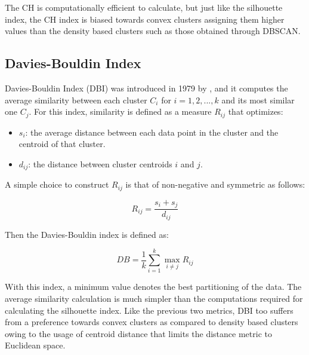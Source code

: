 

The CH is computationally efficient to calculate, but just like the silhouette index, the CH index is biased towards convex clusters assigning them higher values than the density based clusters such as those obtained through DBSCAN.

\subsection{Davies-Bouldin Index}

Davies-Bouldin Index (DBI) was introduced in 1979 by \cite{4766909}, and it computes the average similarity between each cluster $C_i$ for $i = 1,2,...,k$ and its most similar one $C_j$.  For this index, similarity is defined as a measure $R_{ij}$ that optimizes:

\begin{itemize}
    \item $s_i$: the average distance between each data point in the cluster and the centroid of that cluster.
    \item $d_{ij}$: the distance between cluster centroids $i$ and $j$.
\end{itemize}

A simple choice to construct $R_{ij}$ is that of non-negative and symmetric as follows:

\begin{equation}
    R_{ij} = \frac{s_i + s_j}{d_{ij}}
\end{equation}

Then the Davies-Bouldin index is defined as:

\begin{equation}
    DB = \frac{1}{k} \sum_{i=1}^k \max_{i \neq j} R_{ij}
\end{equation}

 With this index, a minimum value denotes the best partitioning of the data. The average similarity calculation is much simpler than the computations required for calculating the silhouette index. Like the previous two metrics, DBI too suffers from a preference towards convex clusters as compared to density based clusters owing to the usage of centroid distance that limits the distance metric to Euclidean space.





